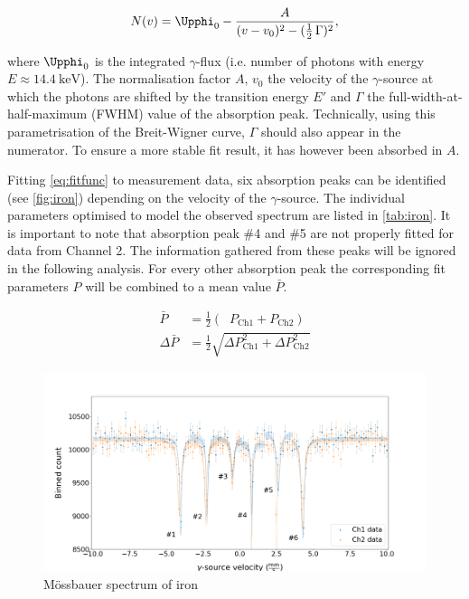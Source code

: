 \begin{equation}
\label{eq:fitfunc}
N(v) = \Upphi_0 - \frac{A}{(v-v_0)^2 - (\frac{1}{2}\,\Gamma)^2},
\end{equation}

where $\Upphi_0$ is the integrated $\gamma$-flux (i.e. number of photons with energy
$E\approx\SI{14.4}{\kilo\electronvolt}$). The normalisation factor $A$, $v_0$ the
velocity of the $\gamma$-source at which the photons are shifted by the transition
energy $E'$ and $\Gamma$ the full-width-at-half-maximum (FWHM) value of the
absorption peak. Technically, using this parametrisation of the Breit-Wigner curve,
$\Gamma$ should also appear in the numerator. To ensure a more stable fit result,
it has however been absorbed in $A$.

Fitting \autoref{eq:fitfunc} to measurement data, six absorption peaks can be
identified (see \autoref{fig:iron}) depending on the velocity of the $\gamma$-source.
The individual parameters optimised to model the observed spectrum are listed in
\autoref{tab:iron}. It is important to note that absorption peak \#4 and \#5 are not
properly fitted for data from Channel 2. The information gathered from these peaks
will be ignored in the following analysis. For every other absorption peak the
corresponding fit parameters $P$ will be combined to a mean value $\bar{P}$.



\begin{align*}
	\bar{P} &= \frac{1}{2}\left(\;\;P_\text{Ch1} + P_\text{Ch2}\right) \\[0.5cm]
	\Delta\bar{P} &= \frac{1}{2}\sqrt{\Delta P_\text{Ch1}^2+\Delta P_\text{Ch2}^2}
\end{align*}

\begin{figure}
	\label{fig:iron}
	\includegraphics[width=1.0\textwidth]{./fig/Iron.png}
	\caption{Mössbauer spectrum of iron}{}
\end{figure}

